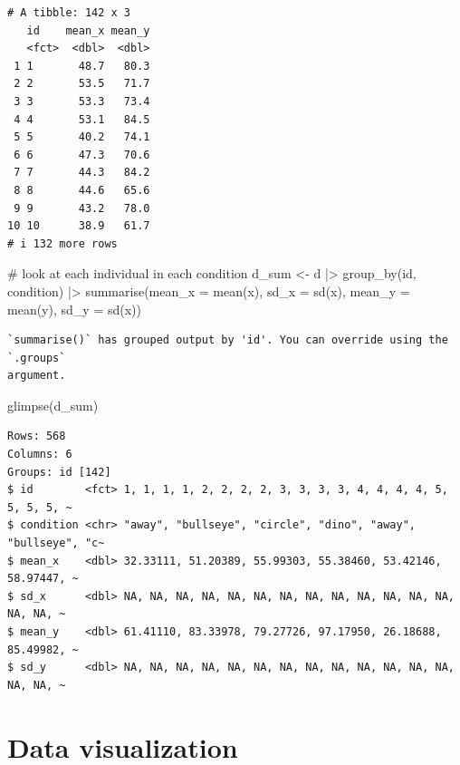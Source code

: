 \documentclass[
  letterpaper,
  DIV=11,
  numbers=noendperiod]{scrreprt}
\newenvironment{Shaded}{\begin{snugshade}}{\end{snugshade}}
\newcommand{\AttributeTok}[1]{\textcolor[rgb]{0.40,0.45,0.13}{#1}}
\newcommand{\CommentTok}[1]{\textcolor[rgb]{0.37,0.37,0.37}{#1}}
\newcommand{\FunctionTok}[1]{\textcolor[rgb]{0.28,0.35,0.67}{#1}}
\newcommand{\NormalTok}[1]{\textcolor[rgb]{0.00,0.23,0.31}{#1}}
\newcommand{\OtherTok}[1]{\textcolor[rgb]{0.00,0.23,0.31}{#1}}
\newcommand{\SpecialCharTok}[1]{\textcolor[rgb]{0.37,0.37,0.37}{#1}}
\begin{document}
\begin{verbatim}
# A tibble: 142 x 3
   id    mean_x mean_y
   <fct>  <dbl>  <dbl>
 1 1       48.7   80.3
 2 2       53.5   71.7
 3 3       53.3   73.4
 4 4       53.1   84.5
 5 5       40.2   74.1
 6 6       47.3   70.6
 7 7       44.3   84.2
 8 8       44.6   65.6
 9 9       43.2   78.0
10 10      38.9   61.7
# i 132 more rows
\end{verbatim}

\begin{Shaded}
\begin{Highlighting}[]
\CommentTok{\# look at each individual in each condition}
\NormalTok{d\_sum }\OtherTok{\textless{}{-}}\NormalTok{ d }\SpecialCharTok{|\textgreater{}} \FunctionTok{group\_by}\NormalTok{(id, condition) }\SpecialCharTok{|\textgreater{}}
    \FunctionTok{summarise}\NormalTok{(}\AttributeTok{mean\_x =} \FunctionTok{mean}\NormalTok{(x),}
              \AttributeTok{sd\_x =} \FunctionTok{sd}\NormalTok{(x),}
              \AttributeTok{mean\_y =} \FunctionTok{mean}\NormalTok{(y),}
              \AttributeTok{sd\_y =} \FunctionTok{sd}\NormalTok{(x))}
\end{Highlighting}
\end{Shaded}

\begin{verbatim}
`summarise()` has grouped output by 'id'. You can override using the `.groups`
argument.
\end{verbatim}

\begin{Shaded}
\begin{Highlighting}[]
\FunctionTok{glimpse}\NormalTok{(d\_sum)}
\end{Highlighting}
\end{Shaded}

\begin{verbatim}
Rows: 568
Columns: 6
Groups: id [142]
$ id        <fct> 1, 1, 1, 1, 2, 2, 2, 2, 3, 3, 3, 3, 4, 4, 4, 4, 5, 5, 5, 5, ~
$ condition <chr> "away", "bullseye", "circle", "dino", "away", "bullseye", "c~
$ mean_x    <dbl> 32.33111, 51.20389, 55.99303, 55.38460, 53.42146, 58.97447, ~
$ sd_x      <dbl> NA, NA, NA, NA, NA, NA, NA, NA, NA, NA, NA, NA, NA, NA, NA, ~
$ mean_y    <dbl> 61.41110, 83.33978, 79.27726, 97.17950, 26.18688, 85.49982, ~
$ sd_y      <dbl> NA, NA, NA, NA, NA, NA, NA, NA, NA, NA, NA, NA, NA, NA, NA, ~
\end{verbatim}


\hypertarget{data-visualization}{%
\chapter{Data visualization}\label{data-visualization}}
\end{document}
